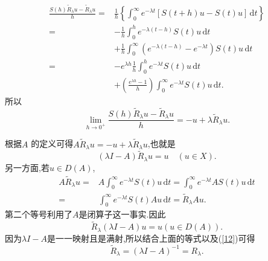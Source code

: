 \begin{frame}[t]
  \begin{align*}
    \frac{S(h)\widetilde{R}_\lambda u-\widetilde{R}_\lambda u}{h}=& \frac{1}{h}\left\{ \int_0^{\infty}e^{-\lambda t}[S(t+h)u-S(t)u]\,\mathrm{d}t\right\} \\
    =& -\frac{1}{h}\int_0^{h}e^{-\lambda(t-h)}S(t)u\,\mathrm{d}t\\
    &+ \frac{1}{h}\int_0^{\infty}(e^{-\lambda(t-h)}-e^{-\lambda t})S(t)u\,\mathrm{d}t\\
    = & -e^{\lambda h}\frac{1}{h}\int_0^{h}e^{-\lambda t }S(t)u\,\mathrm{d}t\\
    &+\left( \frac{e^{\lambda h}-1}{h} \right) \int_0^{\infty}e^{-\lambda t}S(t)u\,\mathrm{d}t
  .\end{align*}
  所以
  \[
    \lim_{h\to 0^{+}}\frac{S(h)\widetilde{R}_\lambda u-\widetilde{R}_\lambda u}{h}=-u +\lambda \widetilde{R}_\lambda u.
  \]
\end{frame}
\begin{frame}[t]
  根据$A$ 的定义可得$A \widetilde{R}_\lambda u=-u+\lambda \widetilde{R}_\lambda u$,也就是
  \begin{equation}
    \left( \lambda I-A \right) \widetilde{R}_\lambda u =u \quad (u\in X).\label{12}
  \end{equation}
  另一方面,若$u\in D(A)$,
  \begin{align*}
    A\widetilde{R}_\lambda u = & A\int_0^{\infty}e^{-\lambda t}S(t)u\,\mathrm{d}t=\int_0^{\infty}e^{-\lambda t}AS(t)u\,\mathrm{d}t\\
    = & \int_0^{\infty}e^{-\lambda t}S(t)Au\,\mathrm{d}t=\widetilde{R}_\lambda A u.
  \end{align*}
第二个等号利用了$A$是闭算子这一事实.因此
 \[
   \widetilde{R}_\lambda \left( \lambda I-A \right) u=u \left( u\in D(A) \right) .
 \] 因为$\lambda I-A$是一一映射且是满射,所以结合上面的等式以及(\ref{12})可得
  \begin{equation}
    \widetilde{R}_\lambda=(\lambda I-A)^{-1}=R_\lambda.
 \end{equation}
\end{frame}
